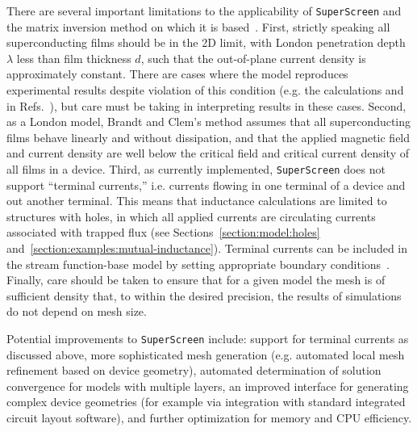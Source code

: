 \documentclass[final,3p,times]{elsarticle}
\newcommand{\inline}[1]{\texttt{#1}\xspace}
\newcommand{\SuperScreen}{\inline{SuperScreen}}
\begin{document}
There are several important limitations to the applicability of \SuperScreen and the matrix inversion method on which it is based~\cite{Brandt2004-ew,Brandt2005-wj}. First, strictly speaking all superconducting films should be in the 2D limit, with London penetration depth $\lambda$ less than film thickness $d$, such that the out-of-plane current density is approximately constant. There are cases where the model reproduces experimental results despite violation of this condition (e.g. the calculations and in Refs.~\cite{Kirtley2016-zz,Kirtley2016-gt}), but care must be taking in interpreting results in these cases. Second, as a London model, Brandt and Clem's method assumes that all superconducting films behave linearly and without dissipation, and that the applied magnetic field and current density are well below the critical field and critical current density of all films in a device. 
Third, as currently implemented, \SuperScreen does not support ``terminal currents,'' i.e. currents flowing in one terminal of a device and out another terminal. This means that inductance calculations are limited to structures with holes, in which all applied currents are circulating currents associated with trapped flux (see Sections~\ref{section:model:holes} and~\ref{section:examples:mutual-inductance}). Terminal currents can be included in the stream function-base model by setting appropriate boundary conditions~\cite{Khapaev1997-kw,Khapaev2001-xq,Khapaev2001-pw,Muller2021-ci}. Finally, care should be taken to ensure that for a given model the mesh is of sufficient density that, to within the desired precision, the results of simulations do not depend on mesh size.

Potential improvements to \SuperScreen include: support for terminal currents as discussed above, more sophisticated mesh generation (e.g. automated local mesh refinement based on device geometry), automated determination of solution convergence for models with multiple layers, an improved interface for generating complex device geometries (for example via integration with standard integrated circuit layout software), and further optimization for memory and CPU efficiency.

\end{document}

